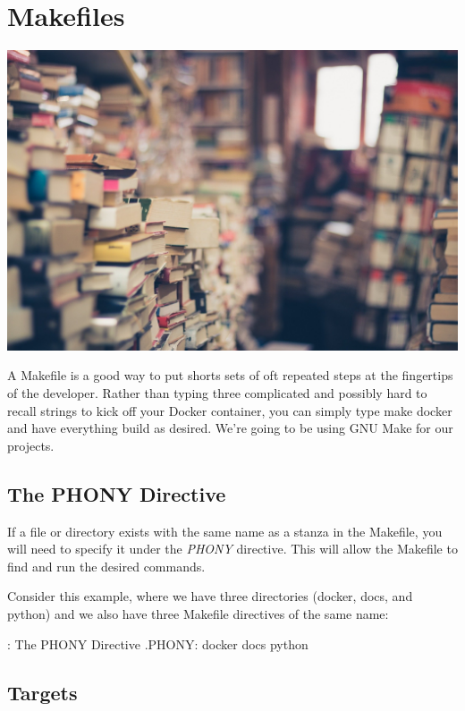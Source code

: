 \chapter{Makefiles}

\includegraphics[scale=0.20]{../images/books-1163695_1920.jpg}

\justify
A Makefile is a good way to put shorts sets of oft repeated steps at the
fingertips of the developer. Rather than typing three complicated and
possibly hard to recall strings to kick off your Docker container, you
can simply type make docker and have everything build as desired. We're
going to be using GNU Make for our projects.

\section{The PHONY Directive}

\justify
If a file or directory exists with the same name as a stanza in the
Makefile, you will need to specify it under the \emph{PHONY} directive.
This will allow the Makefile to find and run the desired commands.

\justify
Consider this example, where we have three directories (docker, docs,
and python) and we also have three Makefile directives of the same name:

\begin{mybox}{\thetcbcounter: The PHONY Directive}
	.PHONY: docker docs python
\end{mybox}

\section{Targets}


